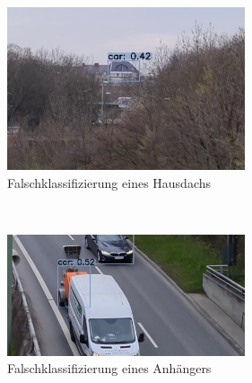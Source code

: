 \documentclass[conference]{IEEEtran}
\begin{document}
	\begin{figure}[!h]
		\begin{center}
			\includegraphics[width=7cm]{Media/Output_108 - Kopie (2).jpg}
			\caption{Falschklassifizierung eines Hausdachs}
			\label{FaK3}
		\end{center}
	\end{figure}\\
	\begin{figure}[!h]
		\begin{center}
			\includegraphics[width=7cm]{Media/Output_829 - Kopie.jpg}
			\caption{Falschklassifizierung eines Anhängers}
			\label{FaK4}
		\end{center}
	\end{figure}\\
	
\end{document}
